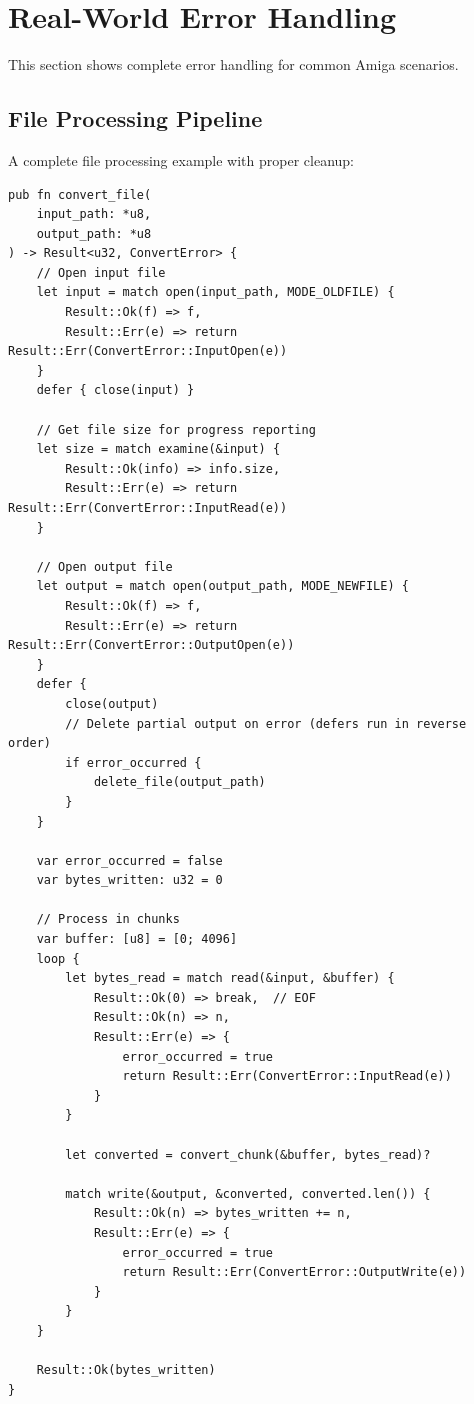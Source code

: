 \section{Real-World Error Handling}
\label{sec:real-world-errors}

This section shows complete error handling for common Amiga scenarios.

\subsection{File Processing Pipeline}

A complete file processing example with proper cleanup:

\begin{lstlisting}
pub fn convert_file(
    input_path: *u8,
    output_path: *u8
) -> Result<u32, ConvertError> {
    // Open input file
    let input = match open(input_path, MODE_OLDFILE) {
        Result::Ok(f) => f,
        Result::Err(e) => return Result::Err(ConvertError::InputOpen(e))
    }
    defer { close(input) }

    // Get file size for progress reporting
    let size = match examine(&input) {
        Result::Ok(info) => info.size,
        Result::Err(e) => return Result::Err(ConvertError::InputRead(e))
    }

    // Open output file
    let output = match open(output_path, MODE_NEWFILE) {
        Result::Ok(f) => f,
        Result::Err(e) => return Result::Err(ConvertError::OutputOpen(e))
    }
    defer {
        close(output)
        // Delete partial output on error (defers run in reverse order)
        if error_occurred {
            delete_file(output_path)
        }
    }

    var error_occurred = false
    var bytes_written: u32 = 0

    // Process in chunks
    var buffer: [u8] = [0; 4096]
    loop {
        let bytes_read = match read(&input, &buffer) {
            Result::Ok(0) => break,  // EOF
            Result::Ok(n) => n,
            Result::Err(e) => {
                error_occurred = true
                return Result::Err(ConvertError::InputRead(e))
            }
        }

        let converted = convert_chunk(&buffer, bytes_read)?

        match write(&output, &converted, converted.len()) {
            Result::Ok(n) => bytes_written += n,
            Result::Err(e) => {
                error_occurred = true
                return Result::Err(ConvertError::OutputWrite(e))
            }
        }
    }

    Result::Ok(bytes_written)
}
\end{lstlisting}

